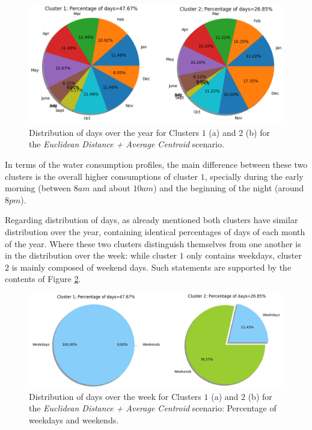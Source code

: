 \documentclass[9pt,journal,compsoc]{IEEEtran}
\begin{document}
\begin{figure}
	\centering
	\includegraphics[scale=0.4]{images/percent_months_euc_average_k12_4.png}
	\caption{Distribution of days over the year for Clusters $1$ (a) and $2$ (b) for the \emph{Euclidean Distance + Average Centroid} scenario.}
	\label{year_dist_k12_euc_average4}
\end{figure}

In terms of the water consumption profiles, the main difference between these two clusters is the overall higher consumptions of cluster $1$, specially during the early morning (between $8am$ and about $10am$) and the beginning of the night (around $8pm$).

Regarding distribution of days, as already mentioned both clusters have similar distribution over the year, containing identical percentages of days of each month of the year. Where these two clusters distinguish themselves from one another is in the distribution over the week: while cluster $1$ only contains weekdays, cluster $2$ is mainly composed of weekend days. Such statements are supported by the contents of Figure \ref{week_dist_k12_eu_average4}.

\begin{figure}
	\centering
	\includegraphics[scale=0.4]{images/percent_week_euc_average_k12_4.png}
	\caption{Distribution of days over the week for Clusters $1$ (a) and $2$ (b) for the \emph{Euclidean Distance + Average Centroid} scenario: Percentage of weekdays and weekends.}
	\label{week_dist_k12_eu_average4}
\end{figure}
\end{document}

